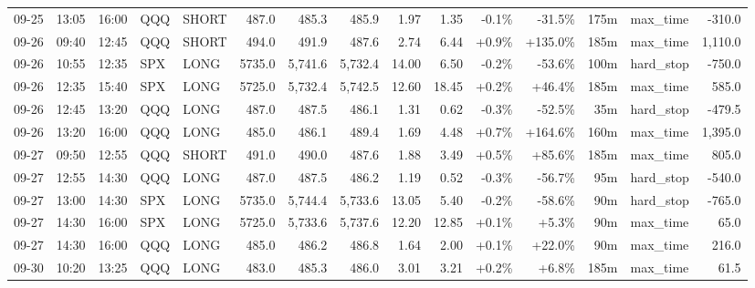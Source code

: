 \documentclass[11pt,a4paper,twoside]{article}
\begin{document}
\begin{landscape}
\begin{center}
\begin{longtable}{>{\color{txtmain}}l l l l l r r r r r r r r >{\color{txtmain}}l r}
09-25 & 13:05 & 16:00 & QQQ & SHORT & 487.0 & 485.3 & 485.9 & 1.97 & 1.35 & \textcolor{lossred}{-0.1\%} & \textcolor{lossred}{-31.5\%} & 175m & max\_time & \textcolor{lossred}{-310.0} \\
09-26 & 09:40 & 12:45 & QQQ & SHORT & 494.0 & 491.9 & 487.6 & 2.74 & 6.44 & \textcolor{wingreen}{+0.9\%} & \textcolor{wingreen}{+135.0\%} & 185m & max\_time & \textcolor{wingreen}{1,110.0} \\
09-26 & 10:55 & 12:35 & SPX & LONG & 5735.0 & 5,741.6 & 5,732.4 & 14.00 & 6.50 & \textcolor{lossred}{-0.2\%} & \textcolor{lossred}{-53.6\%} & 100m & hard\_stop & \textcolor{lossred}{-750.0} \\
09-26 & 12:35 & 15:40 & SPX & LONG & 5725.0 & 5,732.4 & 5,742.5 & 12.60 & 18.45 & \textcolor{wingreen}{+0.2\%} & \textcolor{wingreen}{+46.4\%} & 185m & max\_time & \textcolor{wingreen}{585.0} \\
09-26 & 12:45 & 13:20 & QQQ & LONG & 487.0 & 487.5 & 486.1 & 1.31 & 0.62 & \textcolor{lossred}{-0.3\%} & \textcolor{lossred}{-52.5\%} & 35m & hard\_stop & \textcolor{lossred}{-479.5} \\
09-26 & 13:20 & 16:00 & QQQ & LONG & 485.0 & 486.1 & 489.4 & 1.69 & 4.48 & \textcolor{wingreen}{+0.7\%} & \textcolor{wingreen}{+164.6\%} & 160m & max\_time & \textcolor{wingreen}{1,395.0} \\
09-27 & 09:50 & 12:55 & QQQ & SHORT & 491.0 & 490.0 & 487.6 & 1.88 & 3.49 & \textcolor{wingreen}{+0.5\%} & \textcolor{wingreen}{+85.6\%} & 185m & max\_time & \textcolor{wingreen}{805.0} \\
09-27 & 12:55 & 14:30 & QQQ & LONG & 487.0 & 487.5 & 486.2 & 1.19 & 0.52 & \textcolor{lossred}{-0.3\%} & \textcolor{lossred}{-56.7\%} & 95m & hard\_stop & \textcolor{lossred}{-540.0} \\
09-27 & 13:00 & 14:30 & SPX & LONG & 5735.0 & 5,744.4 & 5,733.6 & 13.05 & 5.40 & \textcolor{lossred}{-0.2\%} & \textcolor{lossred}{-58.6\%} & 90m & hard\_stop & \textcolor{lossred}{-765.0} \\
09-27 & 14:30 & 16:00 & SPX & LONG & 5725.0 & 5,733.6 & 5,737.6 & 12.20 & 12.85 & \textcolor{wingreen}{+0.1\%} & \textcolor{wingreen}{+5.3\%} & 90m & max\_time & \textcolor{wingreen}{65.0} \\
09-27 & 14:30 & 16:00 & QQQ & LONG & 485.0 & 486.2 & 486.8 & 1.64 & 2.00 & \textcolor{wingreen}{+0.1\%} & \textcolor{wingreen}{+22.0\%} & 90m & max\_time & \textcolor{wingreen}{216.0} \\
09-30 & 10:20 & 13:25 & QQQ & LONG & 483.0 & 485.3 & 486.0 & 3.01 & 3.21 & \textcolor{wingreen}{+0.2\%} & \textcolor{wingreen}{+6.8\%} & 185m & max\_time & \textcolor{wingreen}{61.5} \\

\end{longtable}
\end{center}
\end{landscape}
\end{document}
